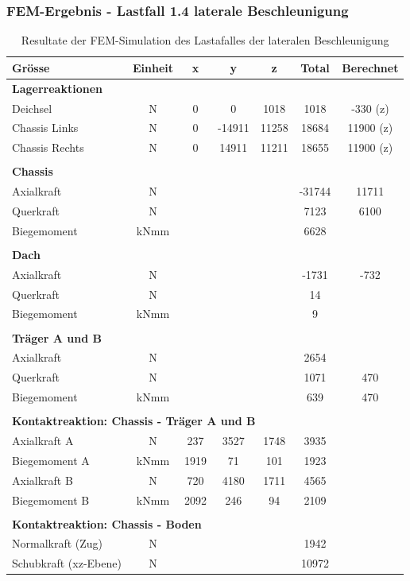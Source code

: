   \subsubsection{FEM-Ergebnis - Lastfall 1.4 laterale Beschleunigung}
  \begin{table}[H]
  \centering
  \begin{tabular}{lcccccc}
  Grösse	&	Einheit	&	x	&	y	&	z	&	Total	&	Berechnet	\\	\hline
  \multicolumn{5}{l}{\textbf{Lagerreaktionen}}									&		&		\\	\thickhline
  Deichsel	&	N	&	0	&	0	&	1018	&	1018	&	-330 (z)	\\
  Chassis Links	&	N	&	0	&	-14911	&	11258	&	18684	&	11900 (z)	\\
  Chassis Rechts	&	N	&	0	&	14911	&	11211	&	18655	&	11900 (z)	\\	\hline	\\
  \multicolumn{5}{l}{\textbf{Chassis}}									&		&		\\	\thickhline
  Axialkraft	&	N	&		&		&		&	-31744	&	11711	\\
  Querkraft	&	N	&		&		&		&	7123	&	6100\footnotemark \\
  Biegemoment	&	kNmm	&		&		&		&	6628	&		\\	\hline	\\
  \multicolumn{5}{l}{\textbf{Dach}}									&		&		\\	\thickhline
  Axialkraft	&	N	&		&		&		&	-1731	&	-732	\\
  Querkraft	&	N	&		&		&		&	14	&		\\
  Biegemoment	&	kNmm	&		&		&		&	9	&		\\	\hline	\\
  \multicolumn{5}{l}{\textbf{Träger A und B}}													\\	\thickhline
  Axialkraft	&	N	&		&		&		&	2654	&		\\
  Querkraft	&	N	&		&		&		&	1071	&	470	\\
  Biegemoment	&	kNmm	&		&		&		&	639	&	470	\\	\hline	\\
  \multicolumn{5}{l}{\textbf{Kontaktreaktion: Chassis - Träger A und B}}									&		&		\\	\thickhline
  Axialkraft A	&	N	&	237	&	3527	&	1748	&	3935	&		\\
  Biegemoment A	&	kNmm	&	1919	&	71	&	101	&	1923	&		\\
  Axialkraft B	&	N	&	720	&	4180	&	1711	&	4565	&		\\
  Biegemoment B	&	kNmm	&	2092	&	246	&	94	&	2109	&		\\	\hline	\\
  \multicolumn{5}{l}{\textbf{Kontaktreaktion: Chassis - Boden}}									&		&		\\	\thickhline
  Normalkraft (Zug)	&	N	&		&		&		&	1942	&		\\
  Schubkraft (xz-Ebene)	&	N	&		&		&		&	10972	&		\\	\hline
  \end{tabular}
  \caption{Resultate der FEM-Simulation des Lastafalles der lateralen Beschleunigung}
  \label{tab:FEM 1.4}
  \end{table}
